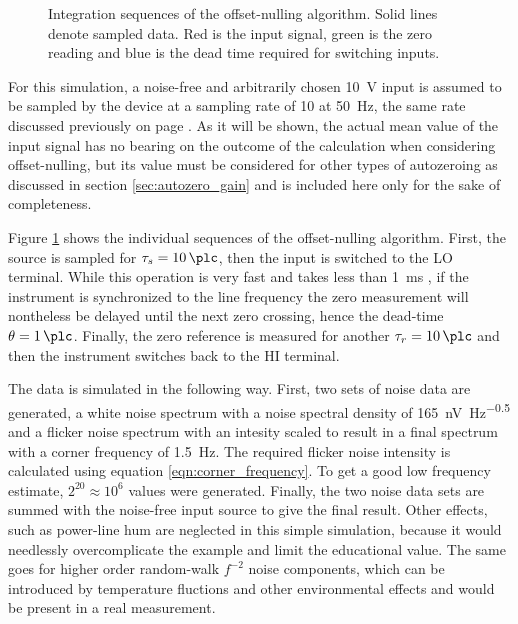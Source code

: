 \begin{figure}[ht]
    \centering
    \caption{Integration sequences of the offset-nulling algorithm. Solid lines denote sampled data. Red is the input signal, green is the zero reading and blue is the dead time required for switching inputs.}
    \label{fig:dmm_autozer_offset_nulling}
\end{figure}

For this simulation, a noise-free and arbitrarily chosen \qty{10}{\V} input is assumed to be sampled by the device at a sampling rate of \qty{10}{\plc} at \qty{50}{\Hz}, the same rate discussed previously on page \pageref{sec:dead_time}. As it will be shown, the actual mean value of the input signal has no bearing on the outcome of the calculation when considering offset-nulling, but its value must be considered for other types of autozeroing as discussed in section \ref{sec:autozero_gain} and is included here only for the sake of completeness.

Figure \ref{fig:dmm_autozer_offset_nulling} shows the individual sequences of the offset-nulling algorithm. First, the source is sampled for $\tau_s = \qty{10}{\plc}$, then the input is switched to the LO terminal. While this operation is very fast and takes less than \qty{1}{\ms} \cite{article_3458A_input_mpedance}, if the instrument is synchronized to the line frequency the zero measurement will nontheless be delayed until the next zero crossing, hence the dead-time $\theta = \qty{1}{\plc}$. Finally, the zero reference is measured for another $\tau_r = \qty{10}{\plc}$ and then the instrument switches back to the HI terminal.

The data is simulated in the following way. First, two sets of noise data are generated, a white noise spectrum with a noise spectral density of \qty[power-half-as-sqrt, per-mode=symbol]{165}{\nV \Hz\tothe{-0.5}} and a flicker noise spectrum with an intesity scaled to result in a final spectrum with a corner frequency of \qty{1.5}{\Hz}. The required flicker noise intensity is calculated using equation \ref{eqn:corner_frequency}. To get a good low frequency estimate, $2^{20} \approx 10^{6}$ values were generated. Finally, the two noise data sets are summed with the noise-free input source to give the final result. Other effects, such as power-line hum are neglected in this simple simulation, because it would needlessly overcomplicate the example and limit the educational value. The same goes for higher order random-walk $f^{-2}$ noise components, which can be introduced by temperature fluctions and other environmental effects and would be present in a real measurement.

